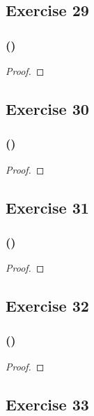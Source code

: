 \documentclass[14pt]{extarticle}
\begin{document}
\subsection{Exercise 29}

\subsubsection{()}

\begin{proof}

\end{proof}

\subsection{Exercise 30}

\subsubsection{()}

\begin{proof}

\end{proof}

\subsection{Exercise 31}

\subsubsection{()}

\begin{proof}

\end{proof}

\subsection{Exercise 32}

\subsubsection{()}

\begin{proof}

\end{proof}

\subsection{Exercise 33}
\end{document}
